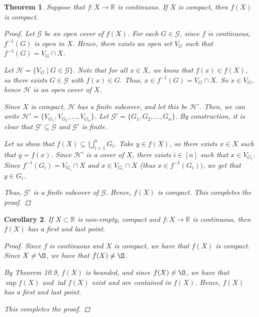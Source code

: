 \documentclass[11pt]{article}
\newcommand{\bbR}{\mathbb{R}}
\renewcommand{\emptyset}{\O}
\providecommand{\arr}{\longrightarrow}
\renewcommand{\_}[1]{\underline{ #1 }}
\newtheorem{theorem}{Theorem}[section]
\newtheorem{corollary}[theorem]{Corollary}
\theoremstyle{definition}
\numberwithin{equation}{subsection}
\begin{document}
\begin{theorem}  Suppose that $f\colon X\to \bbR$ is continuous.  If $X$ is compact, then $f(X)$ is compact.

\begin{proof}
Let $\mathcal{G}$ be an open cover of $f(X)$. For each $G \in \mathcal{G}$, since $f$ is continuous, $f^{-1}(G)$ is open in $X$. Hence, there exists an open set $V_G$ such that $f^{-1}(G)=V_G \cap X$.

Let $\mathcal{H}=\{V_G \mid G \in \mathcal{G}\}$. Note that for all $x \in X$, we know that $f(x) \in f(X)$, so there exists $G \in \mathcal{G}$ with $f(x) \in G$. Thus, $x \in f^{-1}(G)=V_G \cap X$. So $x \in V_G$, hence $\mathcal{H}$ is an open cover of $X$.

Since $X$ is compact, $\mathcal{H}$ has a finite subcover, and let this be $\mathcal{H'}$. Then, we can write $\mathcal{H'}=\{V_{G_1}, V_{G_2}, \dots, V_{G_n}\}$. Let $\mathcal{G'}=\{G_1, G_2, \dots, G_n\}$. By construction, it is clear that $\mathcal{G'}\subseteq \mathcal{G}$ and $\mathcal{G'}$ is finite.

Let us show that $f(X) \subseteq \bigcup_{i=1}^n G_i$. Take $y \in f(X)$, so there exists $x \in X$ such that $y=f(x)$. Since $\mathcal{H'}$ is a cover of $X$, there exists $i \in [n]$ such that $x \in V_{G_i}$. Since $f^{-1}(G_i)=V_{G_i}\cap X$ and $x \in V_{G_i}\cap X$ (thus $x \in f^{-1}(G_i))$, we get that $y \in G_i$.

Thus, $\mathcal{G'}$ is a finite subcover of $\mathcal{G}$. Hence, $f(X)$ is compact. This completes the proof.



\renewcommand\qedsymbol{QED}
\end{proof}


\end{theorem}

\begin{corollary} \label{EVT} If $X \subset \bbR$ is non-empty, compact
and $f\colon X \arr \bbR$ is continuous, then 
$f(X)$ has a first and last point.

\begin{proof}

Since $f$ is continuous and $X$ is compact, we have that $f(X)$ is compact. Since $X \neq \emptyset$, we have that $f(X) \neq \emptyset$. 

By Theorem 10.9, $f(X)$ is bounded, and since $f(X)\neq \emptyset$, we have that $\sup f(X)$ and $\inf f(X)$ exist and are contained in $f(X)$. Hence, $f(X)$ has a first and last point.

This completes the proof.


\renewcommand\qedsymbol{QED}
\end{proof}


\end{corollary}
\end{document}
